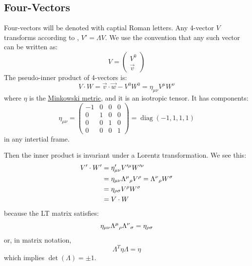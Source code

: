 \documentclass[../Main.tex]{subfiles}
\begin{document}
\subsection{Four-Vectors}
Four-vectors will be denoted with captial Roman letters. Any 4-vector $V$ transforms according to , $V' = \Lambda V$. We use the convention that any such vector can be written as:
\begin{equation*}
    V = \begin{pmatrix}V^0 \\ \vec{v}\end{pmatrix}
\end{equation*}
The pseudo-inner product of 4-vectors is:
\begin{equation*}
    V \cdot W = \vec{v} \cdot \vec{w} - V^0 W^0 = \eta_{\mu \nu} V^\mu W^\nu
\end{equation*}
where $\eta$ is the \underline{Minkowski metric}, and it is an isotropic tensor. It has components:
\begin{equation*}
    \eta_{\mu\nu} = \begin{pmatrix}
        -1 & 0 & 0 & 0 \\
        0 & 1 & 0 & 0 \\
        0 & 0 & 1 & 0 \\
        0 & 0 & 0 & 1
    \end{pmatrix}
    = \operatorname{diag}(-1, 1, 1, 1)
\end{equation*}
in any intertial frame.

Then the inner product is invariant under a Lorentz transformation. We see this:
\begin{align*}
    V' \cdot W' &= \eta_{\mu\nu}' V^{\prime \mu} W^{\prime \nu} \\
    &= \eta_{\mu \nu} \indx{\Lambda}{\mu}{\rho} V^\rho = \indx{\Lambda}{\nu}{\rho} W^\sigma \\
    &= \eta_{\rho \sigma} V^\rho W^\sigma \\
    &= V \cdot W
\end{align*}
because the LT matrix satisfies:
\begin{equation*}
    \eta_{\mu \nu} \indx{\Lambda}{\mu}{\rho} \indx{\Lambda}{\nu}{\sigma} = \eta_{\rho \sigma}
\end{equation*}
or, in matrix notation,
\begin{equation*}
    \Lambda^T \eta \Lambda = \eta
\end{equation*}
which implies $\det(\Lambda) = \pm 1$.
\end{document}
